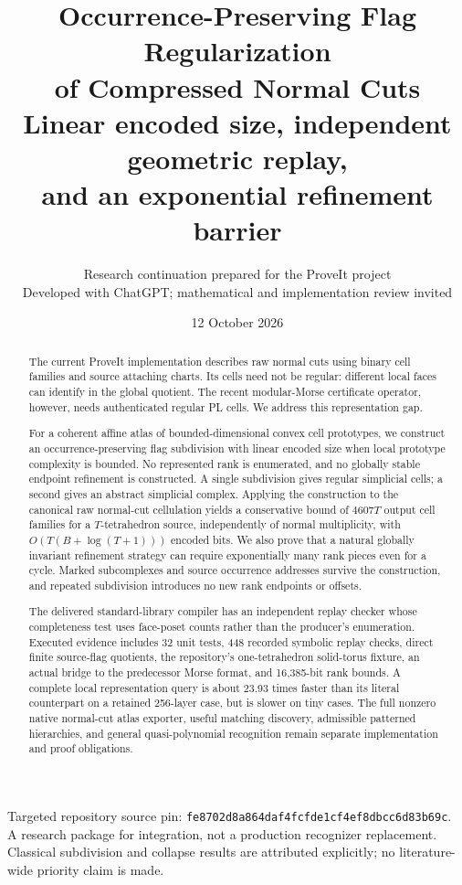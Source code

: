 \documentclass[11pt]{article}
\title{\bfseries Occurrence-Preserving Flag Regularization\\of Compressed Normal Cuts\\[7pt]
\large Linear encoded size, independent geometric replay,\\and an exponential refinement barrier}
\author{Research continuation prepared for the ProveIt project\\\small Developed with ChatGPT; mathematical and implementation review invited}
\date{12 October 2026}
\theoremstyle{definition}\newtheorem{definition}[theorem]{Definition}
\theoremstyle{remark}\newtheorem{remark}[theorem]{Remark}
\newcommand{\sourcepin}{\texttt{fe8702d8a864daf4fcfde1cf4ef8dbcc6d83b69c}}
\begin{document}
\maketitle
\begin{abstract}
The current ProveIt implementation describes raw normal cuts using binary cell families and source attaching charts. Its cells need not be regular: different local faces can identify in the global quotient. The recent modular-Morse certificate operator, however, needs authenticated regular PL cells. We address this representation gap.

For a coherent affine atlas of bounded-dimensional convex cell prototypes, we construct an occurrence-preserving flag subdivision with linear encoded size when local prototype complexity is bounded. No represented rank is enumerated, and no globally stable endpoint refinement is constructed. A single subdivision gives regular simplicial cells; a second gives an abstract simplicial complex. Applying the construction to the canonical raw normal-cut cellulation yields a conservative bound of \(4607T\) output cell families for a \(T\)-tetrahedron source, independently of normal multiplicity, with \(O(T(B+\log(T+1)))\) encoded bits. We also prove that a natural globally invariant refinement strategy can require exponentially many rank pieces even for a cycle. Marked subcomplexes and source occurrence addresses survive the construction, and repeated subdivision introduces no new rank endpoints or offsets.

The delivered standard-library compiler has an independent replay checker whose completeness test uses face-poset counts rather than the producer's enumeration. Executed evidence includes 32 unit tests, 448 recorded symbolic replay checks, direct finite source-flag quotients, the repository's one-tetrahedron solid-torus fixture, an actual bridge to the predecessor Morse format, and 16,385-bit rank bounds. A complete local representation query is about 23.93 times faster than its literal counterpart on a retained 256-layer case, but is slower on tiny cases. The full nonzero native normal-cut atlas exporter, useful matching discovery, admissible patterned hierarchies, and general quasi-polynomial recognition remain separate implementation and proof obligations.
\end{abstract}
\vfill
\begin{center}\small
Targeted repository source pin: \sourcepin.\\
A research package for integration, not a production recognizer replacement.\\
Classical subdivision and collapse results are attributed explicitly; no literature-wide priority claim is made.
\end{center}
\thispagestyle{empty}
\clearpage
\begingroup\small\setlength{\parskip}{0pt}\tableofcontents\endgroup
\clearpage
\end{document}

